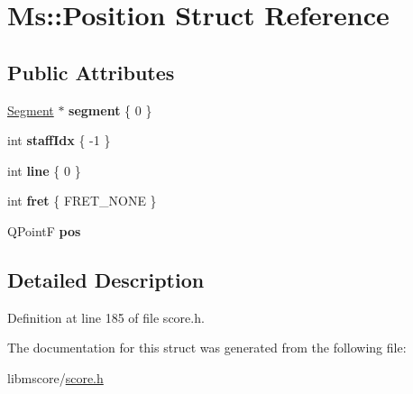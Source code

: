 \hypertarget{struct_ms_1_1_position}{}\section{Ms\+:\+:Position Struct Reference}
\label{struct_ms_1_1_position}
\subsection*{Public Attributes}
\begin{DoxyCompactItemize}
\item 
\mbox{\label{struct_ms_1_1_position_a1e2a764aa7f3f0d219b06415f5abc93d}} 
\hyperlink{class_ms_1_1_segment}{Segment} $\ast$ {\bfseries segment} \{ 0 \}
\item 
\mbox{\label{struct_ms_1_1_position_a2feea1eb55245f72eebc4701d474e66f}} 
int {\bfseries staff\+Idx} \{ -\/1 \}
\item 
\mbox{\label{struct_ms_1_1_position_abbe729294840d35520143a7ebfebfbf7}} 
int {\bfseries line} \{ 0 \}
\item 
\mbox{\label{struct_ms_1_1_position_a5022a69c9da1f8a80cc0182ff6ff318a}} 
int {\bfseries fret} \{ F\+R\+E\+T\+\_\+\+N\+O\+NE \}
\item 
\mbox{\label{struct_ms_1_1_position_a4a5bb90e03f7ee0950a4303af8dc12c2}} 
Q\+PointF {\bfseries pos}
\end{DoxyCompactItemize}


\subsection{Detailed Description}


Definition at line 185 of file score.\+h.



The documentation for this struct was generated from the following file\+:\begin{DoxyCompactItemize}
\item 
libmscore/\hyperlink{score_8h}{score.\+h}\end{DoxyCompactItemize}

